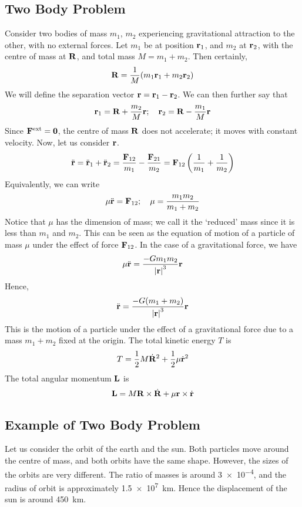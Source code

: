 \subsection{Two Body Problem}
Consider two bodies of mass \(m_1\), \(m_2\) experiencing gravitational attraction to the other, with no external forces.
Let \(m_1\) be at position \(\vb r_1\), and \(m_2\) at \(\vb r_2\), with the centre of mass at \(\vb R\), and total mass \(M = m_1 + m_2\).
Then certainly,
\[
	\vb R = \frac{1}{M}(m_1 \vb r_1 + m_2 \vb r_2)
\]
We will define the separation vector \(\vb r = \vb r_1 - \vb r_2\).
We can then further say that
\[
	\vb r_1 = \vb R + \frac{m_2}{M}\vb r;\quad \vb r_2 = \vb R - \frac{m_1}{M}\vb r
\]
Since \(\vb F^\text{ext} = \vb 0\), the centre of mass \(\vb R\) does not accelerate; it moves with constant velocity.
Now, let us consider \(\vb r\).
\[
	\ddot{\vb{r}} = \ddot{\vb{r}}_1 + \ddot{\vb{r}}_2 = \frac{\vb F_{12}}{m_1} - \frac{\vb F_{21}}{m_2} = \vb F_{12} \left( \frac{1}{m_1} + \frac{1}{m_2} \right)
\]
Equivalently, we can write
\[
	\mu\ddot{\vb{r}} = \vb F_{12};\quad \mu = \frac{m_1 m_2}{m_1 + m_2}
\]
Notice that \(\mu\) has the dimension of mass; we call it the `reduced' mass since it is less than \(m_1\) and \(m_2\).
This can be seen as the equation of motion of a particle of mass \(\mu\) under the effect of force \(\vb F_{12}\).
In the case of a gravitational force, we have
\[
	\mu \ddot{\vb{r}} = \frac{-Gm_1m_2}{\abs{\vb r}^3}\vb r
\]
Hence,
\[
	\ddot{\vb{r}} = \frac{-G(m_1 + m_2)}{\abs{\vb r}^3}\vb r
\]
This is the motion of a particle under the effect of a gravitational force due to a mass \(m_1 + m_2\) fixed at the origin.
The total kinetic energy \(T\) is
\[
	T = \frac{1}{2}M\dot {\vb R}^2 + \frac{1}{2}\mu \dot{\vb{r}}^2
\]
The total angular momentum \(\vb L\) is
\[
	\vb L = M \vb R \times \dot{\vb R} + \mu \vb r \times \dot{\vb r}
\]

\subsection{Example of Two Body Problem}
Let us consider the orbit of the earth and the sun.
Both particles move around the centre of mass, and both orbits have the same shape.
However, the sizes of the orbits are very different.
The ratio of masses is around \num{3e-4}, and the radius of orbit is approximately \SI{1.5e7}{\kilo\metre}.
Hence the displacement of the sun is around \SI{450}{\kilo\metre}.

